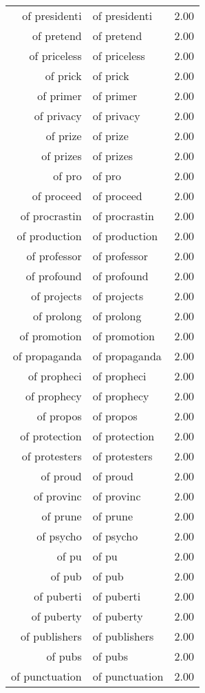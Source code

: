 \begin{table}[ht]
\begin{tabular}{rlr}
  of presidenti & of presidenti & 2.00 \\ 
  of pretend & of pretend & 2.00 \\ 
  of priceless & of priceless & 2.00 \\ 
  of prick & of prick & 2.00 \\ 
  of primer & of primer & 2.00 \\ 
  of privacy & of privacy & 2.00 \\ 
  of prize & of prize & 2.00 \\ 
  of prizes & of prizes & 2.00 \\ 
  of pro & of pro & 2.00 \\ 
  of proceed & of proceed & 2.00 \\ 
  of procrastin & of procrastin & 2.00 \\ 
  of production & of production & 2.00 \\ 
  of professor & of professor & 2.00 \\ 
  of profound & of profound & 2.00 \\ 
  of projects & of projects & 2.00 \\ 
  of prolong & of prolong & 2.00 \\ 
  of promotion & of promotion & 2.00 \\ 
  of propaganda & of propaganda & 2.00 \\ 
  of propheci & of propheci & 2.00 \\ 
  of prophecy & of prophecy & 2.00 \\ 
  of propos & of propos & 2.00 \\ 
  of protection & of protection & 2.00 \\ 
  of protesters & of protesters & 2.00 \\ 
  of proud & of proud & 2.00 \\ 
  of provinc & of provinc & 2.00 \\ 
  of prune & of prune & 2.00 \\ 
  of psycho & of psycho & 2.00 \\ 
  of pu & of pu & 2.00 \\ 
  of pub & of pub & 2.00 \\ 
  of puberti & of puberti & 2.00 \\ 
  of puberty & of puberty & 2.00 \\ 
  of publishers & of publishers & 2.00 \\ 
  of pubs & of pubs & 2.00 \\ 
  of punctuation & of punctuation & 2.00 \\ 

\end{tabular}
\end{table}
